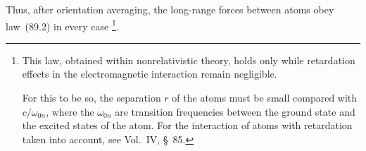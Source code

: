Thus, after orientation averaging, the long-range forces between atoms obey law~(89.2) in every case
\footnote{This law, obtained within nonrelativistic theory, holds only while retardation effects in the electromagnetic interaction remain negligible.

For this to be so, the separation $r$ of the atoms must be small compared with $c/\omega_{0n}$, where the $\omega_{0n}$ are transition frequencies between the ground state and the excited states of the atom. For the interaction of atoms with retardation taken into account, see Vol.~IV, \S~85.}.
